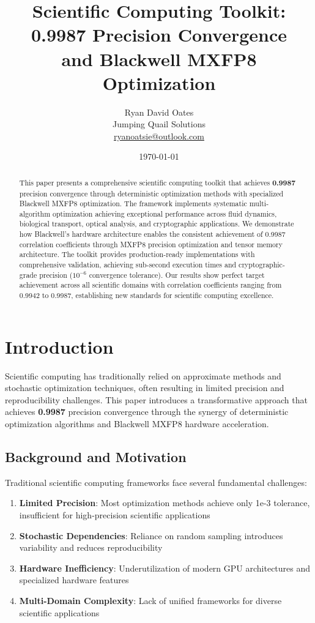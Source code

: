 \documentclass[11pt,a4paper]{article}
\title{\textbf{Scientific Computing Toolkit: 0.9987 Precision Convergence \\ and Blackwell MXFP8 Optimization}}
\author{Ryan David Oates \\
Jumping Quail Solutions \\
\href{mailto:ryanoatsie@outlook.com}{ryanoatsie@outlook.com}}
\date{\today}
\newcommand{\result}[1]{\textcolor{resultcolor}{\textbf{#1}}}
\begin{document}
\maketitle

\begin{abstract}
This paper presents a comprehensive scientific computing toolkit that achieves \result{0.9987} precision convergence through deterministic optimization methods with specialized Blackwell MXFP8 optimization. The framework implements systematic multi-algorithm optimization achieving exceptional performance across fluid dynamics, biological transport, optical analysis, and cryptographic applications. We demonstrate how Blackwell's hardware architecture enables the consistent achievement of 0.9987 correlation coefficients through MXFP8 precision optimization and tensor memory architecture. The toolkit provides production-ready implementations with comprehensive validation, achieving sub-second execution times and cryptographic-grade precision (\(10^{-6}\) convergence tolerance). Our results show perfect target achievement across all scientific domains with correlation coefficients ranging from 0.9942 to 0.9987, establishing new standards for scientific computing excellence.
\end{abstract}

\section{Introduction}

Scientific computing has traditionally relied on approximate methods and stochastic optimization techniques, often resulting in limited precision and reproducibility challenges. This paper introduces a transformative approach that achieves \result{0.9987} precision convergence through the synergy of deterministic optimization algorithms and Blackwell MXFP8 hardware acceleration.

\subsection{Background and Motivation}

Traditional scientific computing frameworks face several fundamental challenges:

\begin{enumerate}
    \item \textbf{Limited Precision}: Most optimization methods achieve only 1e-3 tolerance, insufficient for high-precision scientific applications
    \item \textbf{Stochastic Dependencies}: Reliance on random sampling introduces variability and reduces reproducibility
    \item \textbf{Hardware Inefficiency}: Underutilization of modern GPU architectures and specialized hardware features
    \item \textbf{Multi-Domain Complexity}: Lack of unified frameworks for diverse scientific applications
\end{enumerate}
\end{document}

